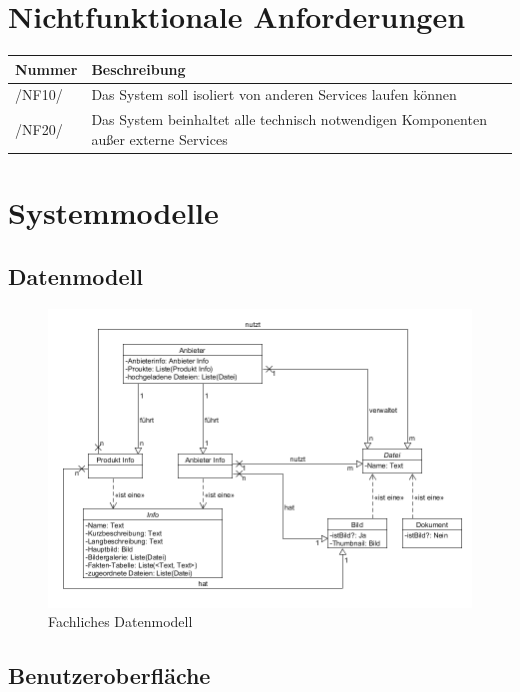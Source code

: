 \documentclass[a4paper,12pt]{article}
\newcommand\addrow[2]{#1 &#2\\ }
\newcommand\addheading[2]{#1 &#2\\ \hline}
\newcommand\tabularhead{\begin{tabular}{lp{13cm}}
\hline
}
\newenvironment{usecase}{\tabularhead}
{\hline\end{tabular}}
\begin{document}
\section{Nichtfunktionale Anforderungen}
\begin{usecase}
  \addheading{Nummer}{Beschreibung} 
  \addrow{/NF10/}{Das System soll isoliert von anderen Services laufen können}
  \addrow{/NF20/}{Das System beinhaltet alle technisch notwendigen Komponenten außer externe Services}
\end{usecase}

\clearpage

\section{Systemmodelle}

\subsection{Datenmodell}

\begin{figure}[!htb]
  \centering
     \includegraphics[width=1.0\textwidth]{FDM.png}
  \caption{Fachliches Datenmodell}
  \label{fig:fmd}
\end{figure}

\clearpage

\subsection{Benutzeroberfläche}
\end{document}
